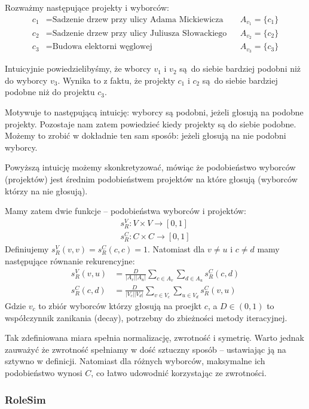 \documentclass{article}
\begin{document}
Rozważmy następujące projekty i wyborców:
\begin{align*}
  c_1 &= \text{Sadzenie drzew przy ulicy Adama Mickiewicza} && A_{v_1} = \{c_1\} \\
  c_2 &= \text{Sadzenie drzew przy ulicy Juliusza Słowackiego} && A_{v_2} = \{c_2\} \\
  c_3 &= \text{Budowa elektorni węglowej} && A_{v_3} = \{c_3\}
\end{align*}

Intuicyjnie powiedzielibyśmy, że wborcy $v_1$ i $v_2$ są do siebie bardziej
podobni niż do wyborcy $v_3$. Wynika to z faktu, że projekty $c_1$ i $c_2$
są do siebie bardziej podobne niż do projektu $c_3$.

Motywuje to następującą intuicję: wyborcy są podobni, jeżeli głosują na podobne
projekty. Pozostaje nam zatem powiedzieć kiedy projekty są do siebie podobne.
Możemy to zrobić w dokładnie ten sam sposób: jeżeli głosują na nie podobni
wyborcy.

Powyższą intuicję możemy skonkretyzować, mówiąc że podobieństwo wyborców
(projektów) jest średnim podobieństwem projektów na które głosują (wyborców
którzy na nie głosują).

Mamy zatem dwie funkcje -- podobieństwa wyborców i projektów:
\begin{align*}
  s^V_R : V \times V \to [0, 1] \\
  s^C_R : C \times C \to [0, 1]
\end{align*}
Definiujemy $s^V_R(v,v)=s^C_R(c,c)=1$. Natomiast dla $v \neq u$ i $c \neq d$
mamy następujące równanie rekurencyjne:
\begin{align*}
  s^V_R(v, u) &= \frac{D}{|A_v| |A_u|} \sum_{c \in A_v} \sum_{d \in A_u} s^C_R(c, d) \\
  s^C_R(c, d) &= \frac{D}{|V_c| |V_d|} \sum_{v \in V_c} \sum_{u \in V_d} s^C_R(v, u)
\end{align*}
Gdzie $v_c$ to zbiór wyborców którzy głosują na proejkt $c$, a $D \in (0, 1)$
to współczynnik zanikania (decay), potrzebny do zbieżności metody iteracyjnej.

Tak zdefiniowana miara spełnia normalizację, zwrotność i symetrię. Warto
jednak zauważyć że zwrotność spełniamy w dość sztuczny sposób -- ustawiając
ją na sztywno w definicji. Natomiast dla różnych wyborców, maksymalne ich
podobieństwo wynosi $C$, co łatwo udowodnić korzystając ze zwrotności.


\subsubsection{RoleSim}
\end{document}
